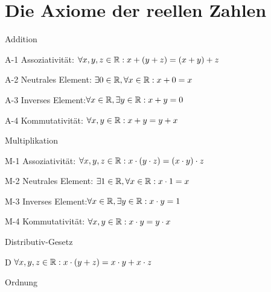 \section{Die Axiome der reellen Zahlen}
	\begin{description}
    
	\item{Addition}
    	
	\begin{description}
    \setlength\itemsep{0em} %
	
		\item{A-1} Assoziativität: $\forall x,y,z\in\mathbb{R}:x+(y+z) = (x+y)+z$
		\item{A-2} Neutrales Element: $\exists0\in\mathbb{R}, \forall x\in\mathbb{R}:x+0=x$
		\item{A-3} Inverses Element:$\forall x \in\mathbb{R}, \exists y \in\mathbb{R}: x+y=0$
		\item{A-4} Kommutativität: $\forall x,y \in\mathbb{R}: x+y = y+x$
	\end{description}
    
    \item{Multiplikation}
	\begin{description}
        \setlength\itemsep{0em} %
	
		\item{M-1} Assoziativität: $\forall x,y,z\in\mathbb{R}:x\cdot (y\cdot z) = (x\cdot y)\cdot z$
		\item{M-2} Neutrales Element: $\exists 1\in\mathbb{R}, \forall x\in\mathbb{R}:x\cdot 1=x$
		\item{M-3} Inverses Element:$\forall x \in\mathbb{R}, \exists y \in\mathbb{R}: x\cdot y=1$
		\item{M-4} Kommutativität: $\forall x,y \in\mathbb{R}: x\cdot y = y\cdot x$
	\end{description}
    
    \item{Distributiv-Gesetz}
	\begin{description}
    \setlength\itemsep{0em} %
	
		\item{D} $\forall x,y,z\in\mathbb{R}:x\cdot (y+z) = x\cdot y + x\cdot z$
	\end{description}
    
    \item{Ordnung}
	\begin{description}
		\setlength\itemsep{0em} %
	

\end{description}
\end{description}
